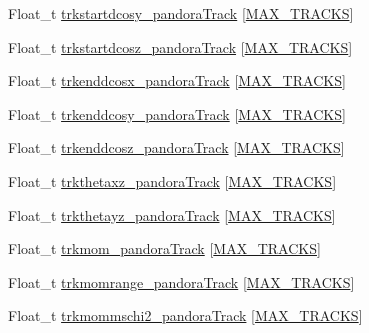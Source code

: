 \begin{DoxyCompactItemize}
\item 
Float\-\_\-t \hyperlink{classanatree_a5cd7c212620288052de913f877c3e5bd}{trkstartdcosy\-\_\-pandora\-Track} \mbox{[}\hyperlink{anatree__core__v09410002_8h_a327fd4e796e4a0d78947524c96e4362e}{M\-A\-X\-\_\-\-T\-R\-A\-C\-K\-S}\mbox{]}
\item 
Float\-\_\-t \hyperlink{classanatree_a47d8c8451ce118eefb61124b3d29e117}{trkstartdcosz\-\_\-pandora\-Track} \mbox{[}\hyperlink{anatree__core__v09410002_8h_a327fd4e796e4a0d78947524c96e4362e}{M\-A\-X\-\_\-\-T\-R\-A\-C\-K\-S}\mbox{]}
\item 
Float\-\_\-t \hyperlink{classanatree_aa0aa24445aa4728bf37f43695db4cfb9}{trkenddcosx\-\_\-pandora\-Track} \mbox{[}\hyperlink{anatree__core__v09410002_8h_a327fd4e796e4a0d78947524c96e4362e}{M\-A\-X\-\_\-\-T\-R\-A\-C\-K\-S}\mbox{]}
\item 
Float\-\_\-t \hyperlink{classanatree_a095b032439341cd11848dbfbd5710f72}{trkenddcosy\-\_\-pandora\-Track} \mbox{[}\hyperlink{anatree__core__v09410002_8h_a327fd4e796e4a0d78947524c96e4362e}{M\-A\-X\-\_\-\-T\-R\-A\-C\-K\-S}\mbox{]}
\item 
Float\-\_\-t \hyperlink{classanatree_af6279aa8e9f6ec8c1f86bc3f0eadd309}{trkenddcosz\-\_\-pandora\-Track} \mbox{[}\hyperlink{anatree__core__v09410002_8h_a327fd4e796e4a0d78947524c96e4362e}{M\-A\-X\-\_\-\-T\-R\-A\-C\-K\-S}\mbox{]}
\item 
Float\-\_\-t \hyperlink{classanatree_ad9f1e172e403a07751ea043eae09071a}{trkthetaxz\-\_\-pandora\-Track} \mbox{[}\hyperlink{anatree__core__v09410002_8h_a327fd4e796e4a0d78947524c96e4362e}{M\-A\-X\-\_\-\-T\-R\-A\-C\-K\-S}\mbox{]}
\item 
Float\-\_\-t \hyperlink{classanatree_a3b69b754f03c24f4f95ff3588f4d1f16}{trkthetayz\-\_\-pandora\-Track} \mbox{[}\hyperlink{anatree__core__v09410002_8h_a327fd4e796e4a0d78947524c96e4362e}{M\-A\-X\-\_\-\-T\-R\-A\-C\-K\-S}\mbox{]}
\item 
Float\-\_\-t \hyperlink{classanatree_a67a174c135adc7925291164837310d9a}{trkmom\-\_\-pandora\-Track} \mbox{[}\hyperlink{anatree__core__v09410002_8h_a327fd4e796e4a0d78947524c96e4362e}{M\-A\-X\-\_\-\-T\-R\-A\-C\-K\-S}\mbox{]}
\item 
Float\-\_\-t \hyperlink{classanatree_a0005c24e7a511ee7cb4db899cd4df8d5}{trkmomrange\-\_\-pandora\-Track} \mbox{[}\hyperlink{anatree__core__v09410002_8h_a327fd4e796e4a0d78947524c96e4362e}{M\-A\-X\-\_\-\-T\-R\-A\-C\-K\-S}\mbox{]}
\item 
Float\-\_\-t \hyperlink{classanatree_a73ccb0435dd251dc6c0ef9f98cb516b2}{trkmommschi2\-\_\-pandora\-Track} \mbox{[}\hyperlink{anatree__core__v09410002_8h_a327fd4e796e4a0d78947524c96e4362e}{M\-A\-X\-\_\-\-T\-R\-A\-C\-K\-S}\mbox{]}

\end{DoxyCompactItemize}
